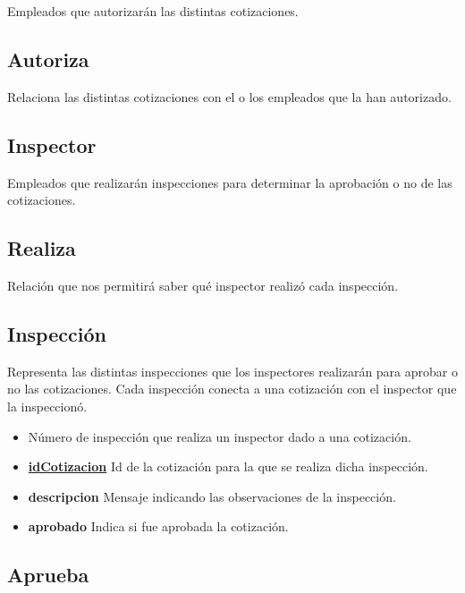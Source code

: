 \documentclass[a4paper,11pt]{article}
\begin{document}
Empleados que autorizarán las distintas cotizaciones.

\subsection{Autoriza}

Relaciona las distintas cotizaciones con el o los empleados que la han autorizado.

\subsection{Inspector}

Empleados que realizarán inspecciones para determinar 
la aprobación o no de las cotizaciones.

\subsection{Realiza}

Relación que nos permitirá saber qué inspector realizó cada inspección.

\subsection{Inspección}

Representa las distintas inspecciones que los inspectores realizarán para aprobar o no las cotizaciones.
Cada inspección conecta a una cotización con el inspector que la inspeccionó.

\begin{itemize}
   
  \item \textbf{} Número de inspección que realiza un inspector dado a una cotización.
  
  \item \textbf{\uline{idCotizacion}} Id de la cotización para la que se realiza dicha inspección.
    
  \item \textbf{descripcion} Mensaje indicando las observaciones de la inspección.

  \item \textbf{aprobado} Indica si fue aprobada la cotización.
    
\end{itemize}

\subsection{Aprueba}
\end{document}
